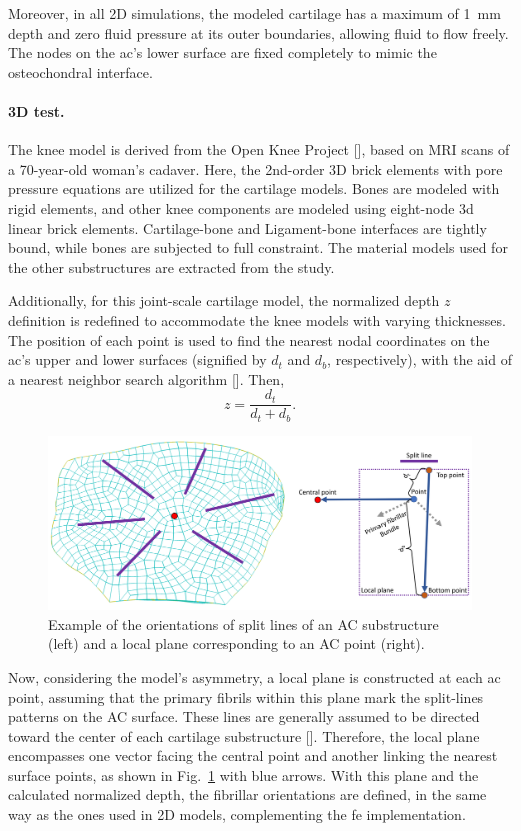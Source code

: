 \documentclass[12pt,a4paper]{report}
\begin{document}
Moreover, in all 2D simulations, the modeled cartilage has a maximum of 1~mm depth and zero fluid pressure at its outer boundaries, allowing fluid to flow freely. The nodes on the \ac{ac}'s lower surface are fixed completely to mimic the osteochondral interface.

\paragraph{3D test.} The knee model is derived from the Open Knee Project [\cite{erdemir2016}], based on MRI scans of a 70-year-old woman's cadaver. Here, the 2nd-order 3D brick elements with pore pressure equations are utilized for the cartilage models. Bones are modeled with rigid elements, and other knee components are modeled using eight-node \ac{3d} linear brick elements. Cartilage-bone and Ligament-bone interfaces are tightly bound, while bones are subjected to full constraint. The material models used for the other substructures are extracted from the \cite{shim2016} study.

Additionally, for this joint-scale cartilage model, the normalized depth $z$ definition is redefined to accommodate the knee models with varying thicknesses. The position of each point is used to find the nearest nodal coordinates on the \ac{ac}'s upper and lower surfaces (signified by $d_t$ and $d_b$, respectively), with the aid of a nearest neighbor search algorithm [\cite{maneewongvatana1999}]. Then, 
%
\begin{equation}
    z = \frac{ d_t }{ d_t+d_b }.
\end{equation}
%
\begin{figure}\centering
\includegraphics[width=\textwidth]{img/direction.jpg}
\caption{Example of the orientations of split lines of an AC substructure (left) and a local plane corresponding to an AC point (right).}
\label{fig:split_lines}
\end{figure}
%
Now, considering the model's asymmetry, a local plane is constructed at each \ac{ac} point, assuming that the primary fibrils within this plane mark the split-lines patterns on the AC surface. These lines are generally assumed to be directed toward the center of each cartilage substructure [\cite{mononen2012}]. Therefore, the local plane encompasses one vector facing the central point and another linking the nearest surface points, as shown in Fig.~\ref{fig:split_lines} with blue arrows. With this plane and the calculated normalized depth, the fibrillar orientations are defined, in the same way as the ones used in 2D models, complementing the \ac{fe} implementation.
\end{document}
